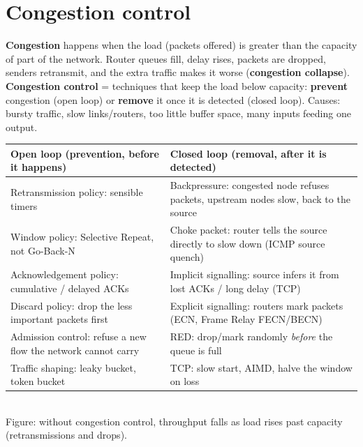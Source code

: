 \documentclass[10pt]{article}
\begin{document}
\section{Congestion control}

\textbf{Congestion} happens when the load (packets offered) is greater than the capacity of part of the network. Router queues fill, delay rises, packets are dropped, senders retransmit, and the extra traffic makes it worse (\textbf{congestion collapse}). \textbf{Congestion control} = techniques that keep the load below capacity: \textbf{prevent} congestion (open loop) or \textbf{remove} it once it is detected (closed loop).
Causes: bursty traffic, slow links/routers, too little buffer space, many inputs feeding one output.

\begin{tabularx}{\linewidth}{@{}XX@{}}
\toprule
\textbf{Open loop (prevention, before it happens)} & \textbf{Closed loop (removal, after it is detected)}\\\midrule
Retransmission policy: sensible timers & Backpressure: congested node refuses packets, upstream nodes slow, back to the source\\
Window policy: Selective Repeat, not Go-Back-N & Choke packet: router tells the source directly to slow down (ICMP source quench)\\
Acknowledgement policy: cumulative / delayed ACKs & Implicit signalling: source infers it from lost ACKs / long delay (TCP)\\
Discard policy: drop the less important packets first & Explicit signalling: routers mark packets (ECN, Frame Relay FECN/BECN)\\
Admission control: refuse a new flow the network cannot carry & RED: drop/mark randomly \emph{before} the queue is full\\
Traffic shaping: leaky bucket, token bucket & TCP: slow start, AIMD, halve the window on loss\\
\bottomrule
\end{tabularx}

\begin{center}
\\
{\scriptsize\color{midgrey}Figure: without congestion control, throughput falls as load rises past capacity (retransmissions and drops).}
\end{center}
\end{document}
